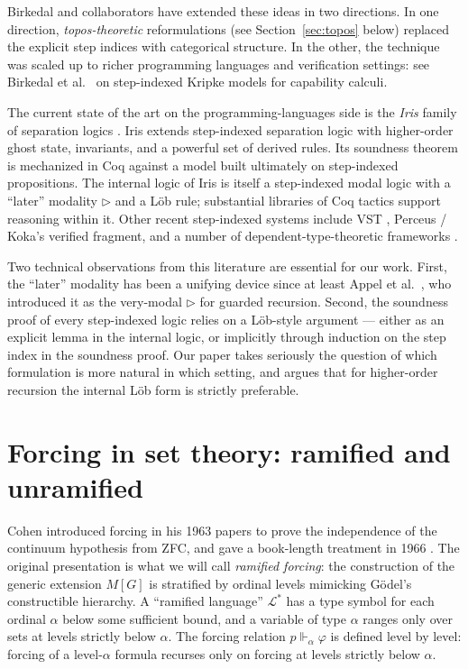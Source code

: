 \documentclass[11pt]{article}
\begin{document}
Birkedal and collaborators have extended these ideas in two
directions. In one direction, \emph{topos-theoretic} reformulations
(see Section~\ref{sec:topos} below) replaced the explicit step indices
with categorical structure. In the other, the technique was scaled up
to richer programming languages and verification settings: see
Birkedal et al.\ \cite{birkedal-et-al-2011-stepindexed} on
step-indexed Kripke models for capability calculi.

The current state of the art on the programming-languages side is the
\emph{Iris} family of separation logics
\cite{jung-et-al-2018,krebbers-jung-bizjak-birkedal-dreyer-2017}.
Iris extends step-indexed separation logic with higher-order ghost
state, invariants, and a powerful set of derived rules. Its
soundness theorem is mechanized in Coq against a model built
ultimately on step-indexed propositions. The internal logic of Iris
is itself a step-indexed modal logic with a ``later'' modality
$\triangleright$ and a Löb rule; substantial libraries of Coq
tactics support reasoning within it. Other recent step-indexed
systems include VST \cite{appel2014vst}, Perceus / Koka's verified
fragment, and a number of dependent-type-theoretic frameworks
\cite{spies2021transfinite}.

Two technical observations from this literature are essential for our
work. First, the ``later'' modality has been a unifying device since
at least Appel et al.\ \cite{appel-melham-mcallester2007}, who
introduced it as the very-modal $\triangleright$ for guarded
recursion. Second, the soundness proof of every step-indexed logic
relies on a Löb-style argument --- either as an explicit lemma in the
internal logic, or implicitly through induction on the step index in
the soundness proof. Our paper takes seriously the question of which
formulation is more natural in which setting, and argues that for
higher-order recursion the internal Löb form is strictly preferable.

\section{Forcing in set theory: ramified and unramified}

Cohen introduced forcing in his 1963 papers
\cite{cohen1963-independence-i,cohen1963-independence-ii} to prove
the independence of the continuum hypothesis from \textsf{ZFC}, and
gave a book-length treatment in 1966 \cite{cohen1966}. The original
presentation is what we will call \emph{ramified forcing}: the
construction of the generic extension $M[G]$ is stratified by
ordinal levels mimicking Gödel's constructible hierarchy. A
``ramified language'' $\mathcal{L}^*$ has a type symbol for each
ordinal $\alpha$ below some sufficient bound, and a variable of type
$\alpha$ ranges only over sets at levels strictly below $\alpha$. The
forcing relation $p \Vdash_\alpha \varphi$ is defined level by level:
forcing of a level-$\alpha$ formula recurses only on forcing at levels
strictly below $\alpha$.
\end{document}
